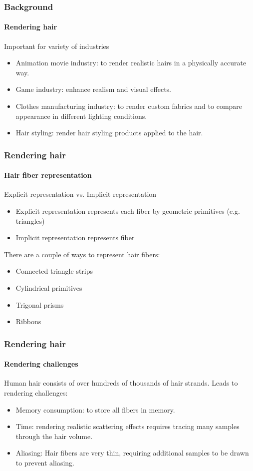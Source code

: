 \documentclass{beamer}
\begin{document}
  \begin{frame}
    \frametitle{Background}
	\framesubtitle{Rendering hair}
	
	Important for variety of industries
	\begin{itemize}
	\item Animation movie industry: to render realistic hairs in a physically accurate way.
	\item Game industry: enhance realism and visual effects.
	\item Clothes manufacturing industry: to render custom fabrics and to compare appearance in different lighting conditions.
	\item Hair styling: render hair styling products applied to the hair.
	\end{itemize}
  \end{frame}
  
  \begin{frame}
    \frametitle{Rendering hair}
	\framesubtitle{Hair fiber representation}
	Explicit representation vs. Implicit representation
	
	\begin{itemize}
	\item Explicit representation represents each fiber by geometric primitives (e.g. triangles)
	\item Implicit representation represents fiber
	\end{itemize}
	
	There are a couple of ways to represent hair fibers:
	\begin{itemize}
	\item Connected triangle strips
	\item Cylindrical primitives
	\item Trigonal prisms
	\item Ribbons
	\end{itemize}
	

  \end{frame}
  
  \begin{frame}
    \frametitle{Rendering hair}
	\framesubtitle{Rendering challenges}
	
	Human hair consists of over hundreds of thousands of hair strands.
	Leads to rendering challenges:
	\begin{itemize}
	\item Memory consumption: to store all fibers in memory.
	\item Time: rendering realistic scattering effects requires tracing many samples through the hair volume.
	\item Aliasing: Hair fibers are very thin, requiring additional samples to be drawn to prevent aliasing.
	\end{itemize}
	

  \end{frame}
  
\end{document}
